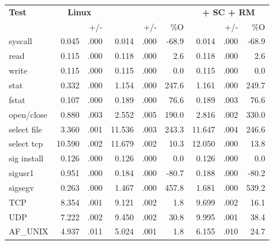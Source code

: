 \begin{table}[t!b!]
\footnotesize
\centering
\begin{tabular}{|l|rr|rrr|rrr|}
\hline
{\bf Test } & \multicolumn{2}{c|}{{\bf Linux}} & \multicolumn{3}{c|}{{\bf \graphene{}
}} & \multicolumn{3}{c|}{{\bf \graphene{} + SC + RM}} \\
&
\usec{} & +/- & 
\usec{} & +/- & \%O &
\usec{} & +/- & \%O \\

\hline

syscall        &  0.045 & .000 &  0.014 & .000 & -68.9 &    0.014 & .000 & -68.9   \\\hline
read           &  0.115 & .000 &  0.118 & .000 &   2.6 &    0.118 & .000 &   2.6   \\\hline
write          &  0.115 & .000 &  0.115 & .000 &   0.0 &    0.115 & .000 &   0.0   \\\hline
stat           &  0.332 & .000 &  1.154 & .000 & 247.6 &    1.161 & .000 & 249.7   \\\hline
fstat          &  0.107 & .000 &  0.189 & .000 &  76.6 &    0.189 & .003 &  76.6   \\\hline
open/close     &  0.880 & .003 &  2.552 & .005 & 190.0 &    2.816 & .002 & 330.0   \\\hline
select file    &  3.360 & .001 & 11.536 & .003 & 243.3 &   11.647 & .004 & 246.6   \\\hline
select tcp     & 10.590 & .002 & 11.679 & .002 &  10.3 &   12.050 & .000 &  13.8   \\\hline
sig install    &  0.126 & .000 &  0.126 & .000 &   0.0 &    0.126 & .000 &   0.0   \\\hline
sigusr1        &  0.951 & .000 &  0.184 & .000 & -80.7 &    0.188 & .000 & -80.2   \\\hline
sigsegv        &  0.263 & .000 &  1.467 & .000 & 457.8 &    1.681 & .000 & 539.2   \\\hline
\hline
TCP            &  8.354 & .001 &  9.121 & .002 &   1.8 &    9.699 & .002 &  16.1   \\\hline
UDP            &  7.222 & .002 &  9.450 & .002 &  30.8 &    9.995 & .001 &  38.4   \\\hline
AF\_UNIX       &  4.937 & .011 &  5.024 & .001 &   1.8 &    6.155 & .010 &  24.7   \\\hline

\end{tabular}
\end{table}
